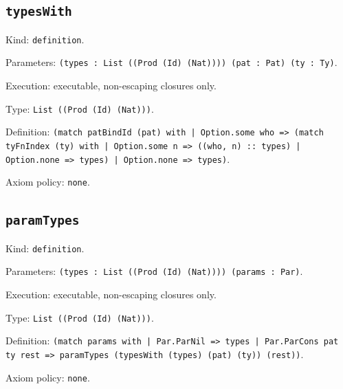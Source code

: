 \documentclass[11pt]{article}
\begin{document}
\subsection*{\texttt{typesWith}}
\noindent Kind: \texttt{definition}.\par
\noindent Parameters: \texttt{(types : List ((Prod (Id) (Nat)))) (pat : Pat) (ty : Ty)}.\par
\noindent Execution: executable, non-escaping closures only.\par
\noindent Type: \texttt{List ((Prod (Id) (Nat)))}.\par
\noindent Definition: \texttt{(match patBindId (pat) with | Option.some who => (match tyFnIndex (ty) with | Option.some n => ((who, n) :: types) | Option.none => types) | Option.none => types)}.\par
\noindent Axiom policy: \texttt{none}.\par
\subsection*{\texttt{paramTypes}}
\noindent Kind: \texttt{definition}.\par
\noindent Parameters: \texttt{(types : List ((Prod (Id) (Nat)))) (params : Par)}.\par
\noindent Execution: executable, non-escaping closures only.\par
\noindent Type: \texttt{List ((Prod (Id) (Nat)))}.\par
\noindent Definition: \texttt{(match params with | Par.ParNil => types | Par.ParCons pat ty rest => paramTypes (typesWith (types) (pat) (ty)) (rest))}.\par
\noindent Axiom policy: \texttt{none}.\par
\end{document}
